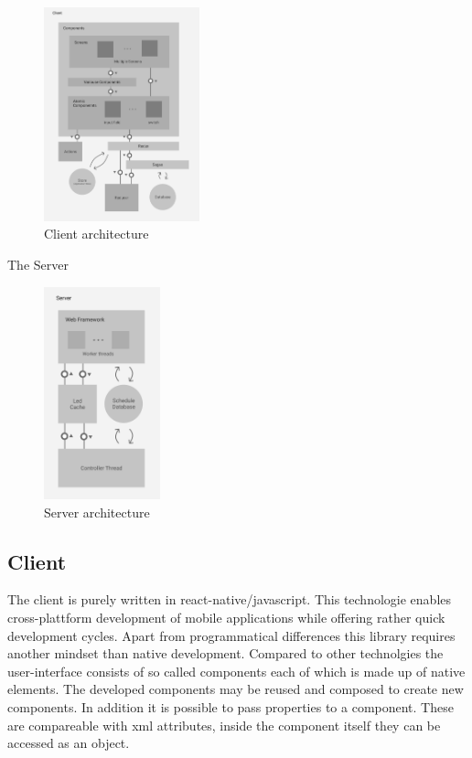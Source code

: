 \documentclass[conference]{IEEEtran}
\begin{document}
\begin{figure}[H]
    \centering
    \includegraphics[width=0.4\textwidth]{client_architecture}
    \caption{Client architecture}
    \label{clientArch}
\end{figure}


The Server
\begin{figure}[H]
    \centering
    \includegraphics[width=0.3\textwidth]{server_architecture}
    \caption{Server architecture}
\end{figure}

\subsection{Client}
The client is purely written in react-native/javascript. This technologie enables cross-plattform development of mobile applications 
while offering rather quick development cycles. Apart from programmatical differences this library requires another mindset than 
native development. Compared to other technolgies the user-interface consists of so called components each of which is made up of
native elements. The developed components may be reused and composed to create new components. In addition it is possible to pass
properties to a component. These are compareable with xml attributes, inside the component itself they can be accessed as an object. 
\end{document}
